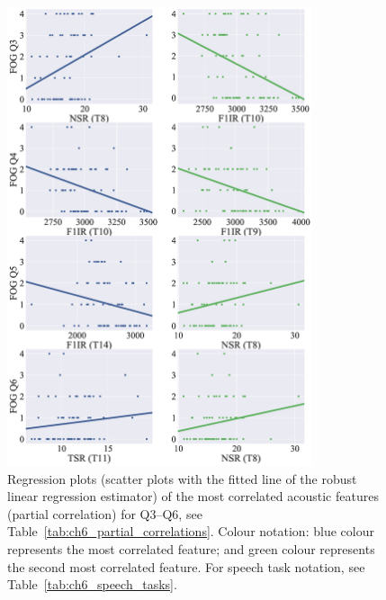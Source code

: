 \begin{figure}[htb!]
	\centering
	\scriptsize
	\includegraphics[width=0.80\textwidth]{pictures/ch6_correlation_plots.eps}
	\caption[Regression plots for FOG-Q (Q3--Q6).]{Regression plots (scatter plots with the fitted line of the robust linear regression estimator) of the most correlated acoustic features (partial correlation) for Q3--Q6, see Table~\ref{tab:ch6_partial_correlations}. Colour notation: blue colour represents the most correlated feature; and green colour represents the second most correlated feature. For speech task notation, see Table~\ref{tab:ch6_speech_tasks}.}
	\label{fig:ch6_correlation_plots}
\end{figure}

